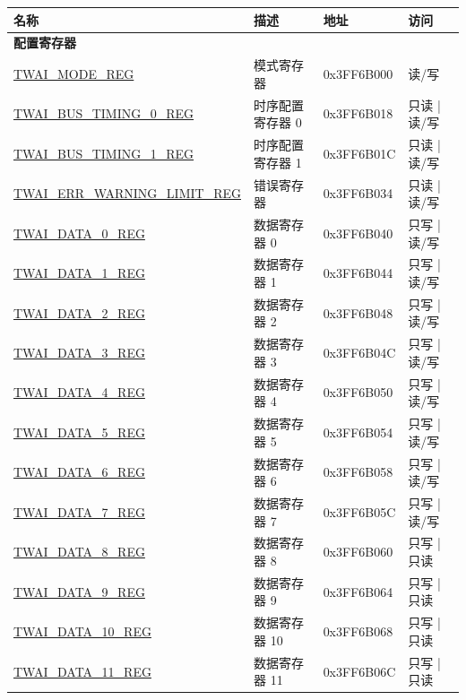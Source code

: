 \begin{longtable}{ | p{6cm} | p{5cm} | p{2.3cm} | p{2cm} | }
\hline\rowcolor{lightgray}
名称 & 描述 &  地址 & 访问 \\ \hline
\endhead
\multicolumn{4}{|l|}{\textbf{配置寄存器}} \\ \hline
\hyperref[regdesc:TWAIMODEREG]{TWAI\_MODE\_REG} & 模式寄存器 & 0x3FF6B000 & 读/写 \\ \hline
\hyperref[regdesc:TWAIBUSTIMING0REG]{TWAI\_BUS\_TIMING\_0\_REG} & 时序配置寄存器 0 & 0x3FF6B018 & 只读 | 读/写 \\ \hline
\hyperref[regdesc:TWAIBUSTIMING1REG]{TWAI\_BUS\_TIMING\_1\_REG} & 时序配置寄存器 1 & 0x3FF6B01C & 只读 | 读/写 \\ \hline
\hyperref[regdesc:TWAIERRWARNINGLIMITREG]{TWAI\_ERR\_WARNING\_LIMIT\_REG} & 错误寄存器 & 0x3FF6B034 & 只读 | 读/写 \\ \hline
\hyperref[regdesc:TWAIDATA0REG]{TWAI\_DATA\_0\_REG} & 数据寄存器 0 & 0x3FF6B040 & 只写 | 读/写 \\ \hline
\hyperref[regdesc:TWAIDATA1REG]{TWAI\_DATA\_1\_REG} & 数据寄存器 1 & 0x3FF6B044 & 只写 | 读/写 \\ \hline
\hyperref[regdesc:TWAIDATA2REG]{TWAI\_DATA\_2\_REG} & 数据寄存器 2 & 0x3FF6B048 & 只写 | 读/写 \\ \hline
\hyperref[regdesc:TWAIDATA3REG]{TWAI\_DATA\_3\_REG} & 数据寄存器 3 & 0x3FF6B04C & 只写 | 读/写 \\ \hline
\hyperref[regdesc:TWAIDATA4REG]{TWAI\_DATA\_4\_REG} & 数据寄存器 4 & 0x3FF6B050 & 只写 | 读/写 \\ \hline
\hyperref[regdesc:TWAIDATA5REG]{TWAI\_DATA\_5\_REG} & 数据寄存器 5 & 0x3FF6B054 & 只写 | 读/写 \\ \hline
\hyperref[regdesc:TWAIDATA6REG]{TWAI\_DATA\_6\_REG} & 数据寄存器 6 & 0x3FF6B058 & 只写 | 读/写 \\ \hline
\hyperref[regdesc:TWAIDATA7REG]{TWAI\_DATA\_7\_REG} & 数据寄存器 7 & 0x3FF6B05C & 只写 | 读/写 \\ \hline
\hyperref[regdesc:TWAIDATA8REG]{TWAI\_DATA\_8\_REG} & 数据寄存器 8 & 0x3FF6B060 & 只写 | 只读 \\ \hline
\hyperref[regdesc:TWAIDATA9REG]{TWAI\_DATA\_9\_REG} & 数据寄存器 9 & 0x3FF6B064 & 只写 | 只读 \\ \hline
\hyperref[regdesc:TWAIDATA10REG]{TWAI\_DATA\_10\_REG} & 数据寄存器 10 & 0x3FF6B068 & 只写 | 只读 \\ \hline
\hyperref[regdesc:TWAIDATA11REG]{TWAI\_DATA\_11\_REG} & 数据寄存器 11 & 0x3FF6B06C & 只写 | 只读 \\ \hline

\end{longtable}
